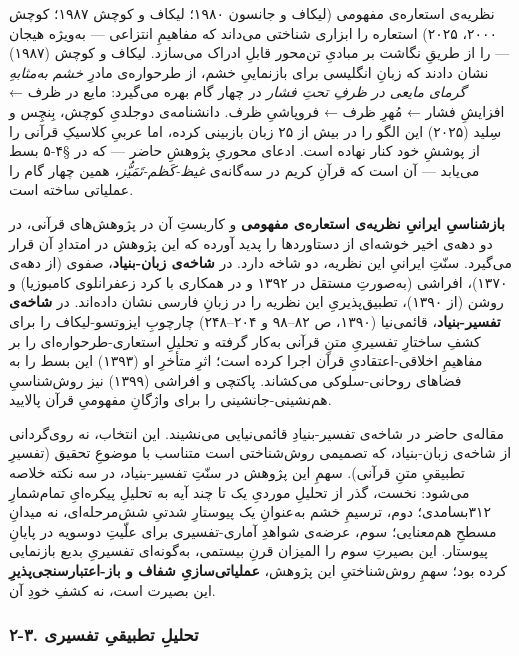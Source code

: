 \begin{RTL}
\begin{otherlanguage}{persian}
نظریه‌ی استعاره‌ی مفهومی (لیکاف و جانسون ۱۹۸۰؛ لیکاف و کوچش ۱۹۸۷؛ کوچش
۲۰۰۰، ۲۰۲۵) استعاره را ابزاری شناختی می‌داند که مفاهیمِ انتزاعی --- به‌ویژه
هیجان --- را از طریقِ نگاشت بر مبادیِ تن‌محور قابلِ ادراک می‌سازد. لیکاف و
کوچش (۱۹۸۷) نشان دادند که زبانِ انگلیسی برای بازنماییِ خشم، از طرحواره‌ی
مادرِ \emph{خشم به‌مثابهِ گرمای مایعی در ظرفِ تحتِ فشار} در چهار گام بهره
می‌گیرد: مایع در ظرف ← افزایشِ فشار ← مُهرِ ظرف ← فروپاشیِ ظرف. دانشنامه‌ی
دوجلدیِ کوچش، بِنچِس و سِلید (۲۰۲۵) این الگو را در بیش از ۲۵ زبان بازبینی
کرده، اما عربیِ کلاسیکِ قرآنی را از پوششِ خود کنار نهاده است. ادعای محوریِ
پژوهشِ حاضر --- که در §۴-۵ بسط می‌یابد --- آن است که قرآنِ کریم در سه‌گانه‌ی
\emph{غیظ-کَظم-تَمَیُّز}، همین چهار گام را عملیاتی ساخته است.

\textbf{بازشناسیِ ایرانیِ نظریه‌ی استعاره‌ی مفهومی} و کاربستِ آن در پژوهش‌های
قرآنی، در دو دهه‌ی اخیر خوشه‌ای از دستاوردها را پدید آورده که این پژوهش در
امتدادِ آن قرار می‌گیرد. سنّتِ ایرانیِ این نظریه، دو شاخه دارد. در
\textbf{شاخه‌ی زبان-بنیاد}، صفوی (از دهه‌ی ۱۳۷۰)، افراشی (به‌صورتِ مستقل در
۱۳۹۲ و در همکاری با کرد زعفرانلوی کامبوزیا) و روشن (از ۱۳۹۰)، تطبیق‌پذیریِ
این نظریه را در زبانِ فارسی نشان داده‌اند. در \textbf{شاخه‌ی تفسیر-بنیاد}،
قائمی‌نیا (۱۳۹۰، ص ۸۲--۹۸ و ۲۰۴--۲۴۸) چارچوبِ ایزوتسو-لیکاف را برای کشفِ
ساختارِ تفسیریِ متنِ قرآنی به‌کار گرفته و تحلیلِ استعاری-طرحواره‌ای را بر
مفاهیمِ اخلاقی-اعتقادیِ قرآن اجرا کرده است؛ اثرِ متأخرِ او (۱۳۹۳) این بسط را
به فضاهای روحانی-سلوکی می‌کشاند. پاکتچی و افراشی (۱۳۹۹) نیز روش‌شناسیِ
هم‌نشینی-جانشینی را برای واژگانِ مفهومیِ قرآن پالایید.

مقاله‌ی حاضر در شاخه‌ی تفسیر-بنیادِ قائمی‌نیایی می‌نشیند. این انتخاب، نه
روی‌گردانی از شاخه‌ی زبان-بنیاد، که تصمیمی روش‌شناختی است متناسب با موضوعِ
تحقیق (تفسیرِ تطبیقیِ متنِ قرآنی). سهمِ این پژوهش در سنّتِ تفسیر-بنیاد، در سه
نکته خلاصه می‌شود: نخست، گذر از تحلیلِ موردیِ یک تا چند آیه به تحلیلِ
پیکره‌ایِ تمام‌شمارِ ۳۱۲‌بسامدی؛ دوم، ترسیمِ خشم به‌عنوانِ یک پیوستارِ شدتیِ
شش‌مرحله‌ای، نه میدانِ مسطحِ هم‌معنایی؛ سوم، عرضه‌ی شواهدِ آماری-تفسیری برای
علّیتِ دوسویه در پایانِ پیوستار. این بصیرتِ سوم را المیزان قرنِ بیستمی،
به‌گونه‌ای تفسیریِ بدیع بازنمایی کرده بود؛ سهمِ روش‌شناختیِ این پژوهش،
\textbf{عملیاتی‌سازیِ شفاف و باز-اعتبارسنجی‌پذیرِ} این بصیرت است، نه کشفِ خودِ
آن.

\subsubsection{۲-۳. تحلیلِ تطبیقیِ
تفسیری}\label{ux62aux62dux644ux6ccux644-ux62aux637ux628ux6ccux642ux6cc-ux62aux641ux633ux6ccux631ux6cc}


\end{otherlanguage}
\end{RTL}
